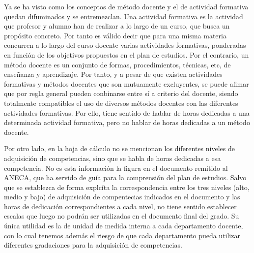 		Ya se ha visto como los conceptos de método docente y el de actividad formativa quedan difuminados y se entremezclan. Una actividad formativa es la actividad que profesor y alumno han de realizar a lo largo de un curso, que busca un propósito concreto. Por tanto es válido decir que para una misma materia concurren a lo largo del curso docente varias actividades formativas, ponderadas en función de los objetivos propuestos en el plan de estudios. Por el contrario, un método docente es un conjunto de formas, procedimientos, técnicas, etc, de enseñanza y aprendizaje. Por tanto, y a pesar de que existen actividades formativas y métodos docentes que son mutuamente excluyentes, se puede afimar que por regla general pueden conbinarse entre sí a criterio del docente, siendo totalmente compatibles el uso de diversos métodos docentes con las diferentes actividades formativas. Por ello, tiene sentido de hablar de horas dedicadas a una determinada actividad formativa, pero no hablar de horas dedicadas a un método docente. 
      
		Por otro lado, en la hoja de cálculo no se mencionan los diferentes niveles de adquisición de competencias, sino que se habla de horas dedicadas a esa competencia. No es esta información la figura en el documento remitido al ANECA, que ha servido de guía para la comprensión del plan de estudios. Salvo que se establezca de forma explcíta la correspondencia entre los tres niveles (alto, medio y bajo) de adquisición de compentecias indicados en el documento y las horas de dedicación correspondientes a cada nivel, no tiene sentido establecer escalas que luego no podrán ser utilizadas en el documento final del grado. Su única utilidad es la de unidad de medida interna a cada departamento docente, con lo cual tenemos además el riesgo de que cada departamento pueda utilizar diferentes gradaciones para la adquisición de competencias.
      
